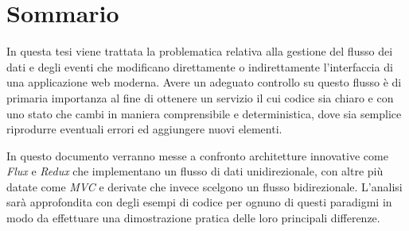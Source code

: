 \chapter*{Sommario}

In questa tesi viene trattata la problematica relativa alla gestione del flusso dei dati e degli eventi che modificano direttamente o indirettamente l'interfaccia di una applicazione web moderna. Avere un adeguato controllo su questo flusso è di primaria importanza al fine di ottenere un servizio il cui codice sia chiaro e con uno stato che cambi in maniera comprensibile e deterministica, dove sia semplice riprodurre eventuali errori ed aggiungere nuovi elementi.

In questo documento verranno messe a confronto architetture innovative come \textit{Flux} e \textit{Redux} che implementano un flusso di dati unidirezionale, con altre più datate come \textit{MVC} e derivate che invece scelgono un flusso bidirezionale. 
L'analisi sarà approfondita con degli esempi di codice per ognuno di questi paradigmi in modo da effettuare una dimostrazione pratica delle loro principali differenze.